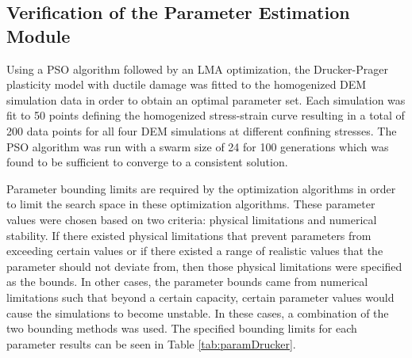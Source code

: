 \subsection{Verification of the Parameter Estimation Module}

Using a PSO algorithm followed by an LMA optimization, the Drucker-Prager plasticity model with ductile damage was fitted to the homogenized DEM simulation data in order to obtain an optimal parameter set. Each simulation was fit to 50 points defining the homogenized stress-strain curve resulting in a total of 200 data points for all four DEM simulations at different confining stresses. The PSO algorithm was run with a swarm size of 24 for 100 generations which was found to be sufficient to converge to a consistent solution.

Parameter bounding limits are required by the optimization algorithms in order to limit the search space in these optimization algorithms. These parameter values were chosen based on two criteria: physical limitations and numerical stability. If there existed physical limitations that prevent parameters from exceeding certain values or if there existed a range of realistic values that the parameter should not deviate from, then those physical limitations were specified as the bounds. In other cases, the parameter bounds came from numerical limitations such that beyond a certain capacity, certain parameter values would cause the simulations to become unstable. In these cases, a combination of the two bounding methods was used. The specified bounding limits for each parameter results can be seen in Table \ref{tab:paramDrucker}.

